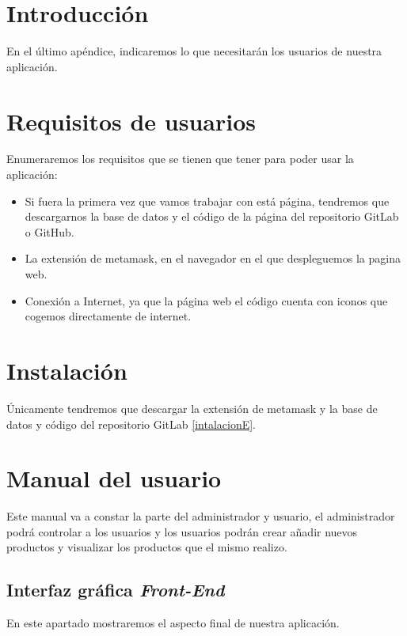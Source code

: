 
\section{Introducción}

En el último apéndice, indicaremos lo que necesitarán los usuarios de nuestra aplicación.

\section{Requisitos de usuarios}
 Enumeraremos los requisitos que se tienen que tener para poder usar la aplicación:
\begin{itemize}
 \item Si fuera la primera vez que vamos trabajar con está página, tendremos que descargarnos la base de datos y el código de la página del repositorio GitLab o GitHub.
 \item La extensión de metamask, en el navegador en el que despleguemos la pagina web.
 \item Conexión a Internet, ya que la página web el código cuenta con iconos que cogemos directamente de internet.
\end{itemize}
 
\section{Instalación}

Únicamente tendremos que descargar la extensión de metamask y la base de datos y código del repositorio GitLab \ref{intalacionE}.

\section{Manual del usuario}

Este manual va a constar la parte del administrador y usuario, el administrador podrá controlar a los usuarios y los usuarios podrán crear añadir nuevos productos y visualizar los productos que el mismo realizo. 

\subsection{Interfaz gráfica \textit{Front-End}\label{ref:front}}

En este apartado mostraremos el aspecto final de nuestra aplicación.

